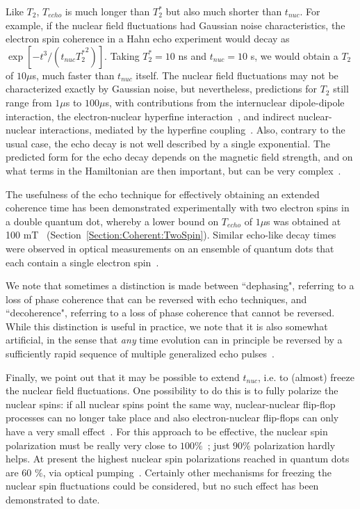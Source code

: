 \documentclass[12pt,aps,nofootinbib]{revtex4-1}
\begin{document}
Like $T_2$, $T_{echo}$ is much longer than $T_2^*$ but also much shorter than $t_{nuc}$. For example, if the nuclear field fluctuations had Gaussian noise characteristics, the electron spin coherence in a Hahn echo experiment would decay as $\exp[- t^3 / (t_{nuc} {T_2^*}^2)]$\cite{hahn56}. Taking $T_2^* = 10$ ns and $t_{nuc} = 10$ s, we would obtain a $T_2$ of $10 \mu$s, much faster than $t_{nuc}$ itself. The nuclear field fluctuations may not be characterized exactly by Gaussian noise, but nevertheless, predictions for $T_2$ still range from $1 \mu$s to $100 \mu$s, with contributions from the internuclear dipole-dipole interaction\cite{sousa03c,witzel05,yao05}, the electron-nuclear hyperfine interaction~\cite{khaetskii02,coish04}, and indirect nuclear-nuclear interactions, mediated by the hyperfine coupling~\cite{yao05,shenvi05}. Also, contrary to the usual case, the echo decay is not well described by a single exponential. The predicted form for the echo decay depends on the magnetic field strength, and on what terms in the Hamiltonian are then important, but can be very complex~\cite{coish04,yao05,sousa06}.

The usefulness of the echo technique for effectively obtaining an extended coherence time has been demonstrated experimentally with two electron spins in a double quantum dot, whereby a lower bound on $T_{echo}$ of $1 \mu$s was obtained at 100 mT~\cite{petta05} (Section~\ref{Section:Coherent:TwoSpin}). Similar echo-like decay times were observed in optical measurements on an ensemble of quantum dots that each contain a single electron spin~\cite{greilich06b}. 

We note that sometimes a distinction is made between ``dephasing", referring to a loss of phase coherence that can be reversed with echo techniques, and ``decoherence", referring to a loss of phase coherence that cannot be reversed. While this distinction is useful in practice, we note that it is also somewhat artificial, in the sense that \emph{any} time evolution can in principle be reversed by a sufficiently rapid sequence of multiple generalized echo pulses~\cite{augustine97,viola98a,viola98b}.

Finally, we point out that it may be possible to extend $t_{nuc}$, i.e. to (almost) freeze the nuclear field fluctuations. One possibility to do this is to fully polarize the nuclear spins: if all nuclear spins point the same way, nuclear-nuclear flip-flop processes can no longer take place and also electron-nuclear flip-flops can only have a very small effect~\cite{khaetskii02,khaetskii03,schliemann02}. For this approach to be effective, the nuclear spin polarization must be really very close to $100\%$~\cite{schliemann02}; just $90\%$ polarization hardly helps. At present the highest nuclear spin polarizations reached in quantum dots are 60 $\%$, via optical pumping~\cite{bracker05a}. Certainly other mechanisms for freezing the nuclear spin fluctuations could be considered, but no such effect has been demonstrated to date.\\
\end{document}

